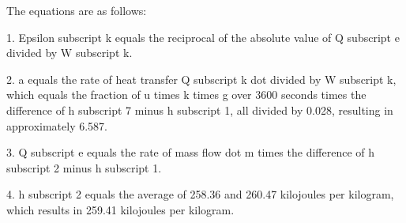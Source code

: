 The equations are as follows:

1. Epsilon subscript k equals the reciprocal of the absolute value of Q subscript e divided by W subscript k.

2. a equals the rate of heat transfer Q subscript k dot divided by W subscript k, which equals the fraction of u times k times g over 3600 seconds times the difference of h subscript 7 minus h subscript 1, all divided by 0.028, resulting in approximately 6.587.

3. Q subscript e equals the rate of mass flow dot m times the difference of h subscript 2 minus h subscript 1.

4. h subscript 2 equals the average of 258.36 and 260.47 kilojoules per kilogram, which results in 259.41 kilojoules per kilogram.
